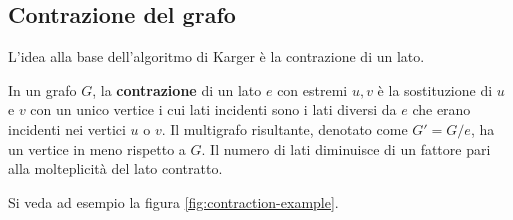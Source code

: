 \subsection{Contrazione del grafo}
\label{sub:karger-contraction}

L'idea alla base dell'algoritmo di Karger è la contrazione di un lato.

\begin{defn}
In un grafo $ G $, la \textbf{contrazione} di un lato $e$ con estremi $u, v$ è la sostituzione di $ u $ e $ v $ con un unico vertice i cui lati incidenti sono i lati diversi da $ e $ che erano incidenti nei vertici $ u $ o $ v $.
Il multigrafo risultante, denotato come $G' = G/e$, ha un vertice in meno rispetto a $G$. Il numero di lati diminuisce di un fattore pari alla molteplicità del lato contratto.
\end{defn}

\noindent Si veda ad esempio la figura \ref{fig:contraction-example}.



